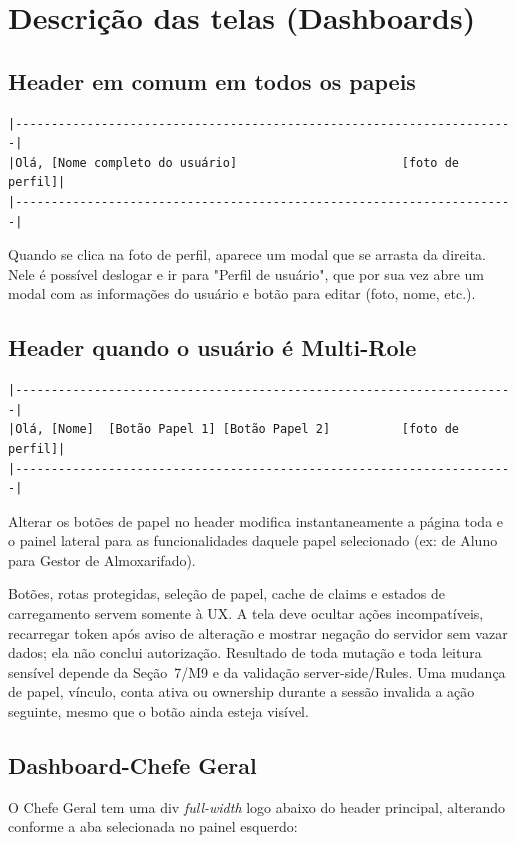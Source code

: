 \section{Descrição das telas (Dashboards)}
\subsection{Header em comum em todos os papeis}
\begin{verbatim}
|----------------------------------------------------------------------|
|Olá, [Nome completo do usuário]                       [foto de perfil]|
|----------------------------------------------------------------------|
\end{verbatim}
Quando se clica na foto de perfil, aparece um modal que se arrasta da direita. Nele é possível deslogar e ir para "Perfil de usuário", que por sua vez abre um modal com as informações do usuário e botão para editar (foto, nome, etc.).

\subsection{Header quando o usuário é Multi-Role}
\begin{verbatim}
|----------------------------------------------------------------------|
|Olá, [Nome]  [Botão Papel 1] [Botão Papel 2]          [foto de perfil]|
|----------------------------------------------------------------------|
\end{verbatim}
Alterar os botões de papel no header modifica instantaneamente a página toda e o painel lateral para as funcionalidades daquele papel selecionado (ex: de Aluno para Gestor de Almoxarifado).

\begin{regra}
Botões, rotas protegidas, seleção de papel, cache de claims e estados de
carregamento servem somente à UX. A tela deve ocultar ações incompatíveis,
recarregar token após aviso de alteração e mostrar negação do servidor sem
vazar dados; ela não conclui autorização. Resultado de toda mutação e toda
leitura sensível depende da Seção~7/M9 e da validação server-side/Rules. Uma
mudança de papel, vínculo, conta ativa ou ownership durante a sessão invalida a
ação seguinte, mesmo que o botão ainda esteja visível.
\end{regra}

\subsection{Dashboard-Chefe Geral}
O Chefe Geral tem uma div \textit{full-width} logo abaixo do header principal, alterando conforme a aba selecionada no painel esquerdo:

